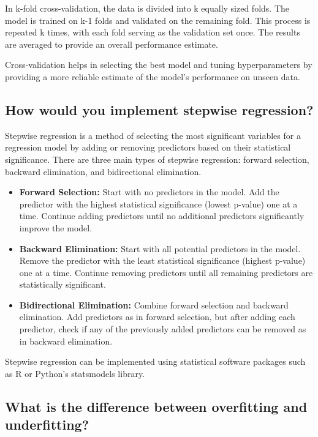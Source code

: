 \documentclass[12pt]{article}
\begin{document}
In k-fold cross-validation, the data is divided into k equally sized folds. The model is trained on k-1 folds and validated on the remaining fold. This process is repeated k times, with each fold serving as the validation set once. The results are averaged to provide an overall performance estimate.

Cross-validation helps in selecting the best model and tuning hyperparameters by providing a more reliable estimate of the model's performance on unseen data.

\subsection{How would you implement stepwise regression?}

Stepwise regression is a method of selecting the most significant variables for a regression model by adding or removing predictors based on their statistical significance. There are three main types of stepwise regression: forward selection, backward elimination, and bidirectional elimination.

\begin{itemize}
    \item \textbf{Forward Selection:} Start with no predictors in the model. Add the predictor with the highest statistical significance (lowest p-value) one at a time. Continue adding predictors until no additional predictors significantly improve the model.
    \item \textbf{Backward Elimination:} Start with all potential predictors in the model. Remove the predictor with the least statistical significance (highest p-value) one at a time. Continue removing predictors until all remaining predictors are statistically significant.
    \item \textbf{Bidirectional Elimination:} Combine forward selection and backward elimination. Add predictors as in forward selection, but after adding each predictor, check if any of the previously added predictors can be removed as in backward elimination.
\end{itemize}

Stepwise regression can be implemented using statistical software packages such as R or Python's statsmodels library.

\subsection{What is the difference between overfitting and underfitting?}
\end{document}
